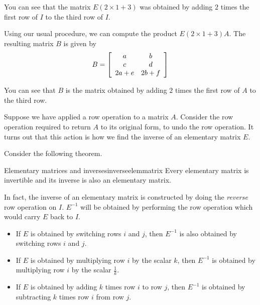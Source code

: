 \begin{solution}
You can see that the matrix $E\left( 2 \times 1+3\right)$ was obtained by adding $2$ times the first row
of $I$ to the third row of $I$. 

Using our usual procedure, we can compute the product $E\left( 2 \times 1+3\right)A$. The resulting 
matrix $B$ is given by 
\begin{equation*}
B = \left[
\begin{array}{cc}
a & b \\
c & d \\
2a+e & 2b+f
\end{array}
\right]
\end{equation*}

You can see that $B$ is the matrix obtained by adding $2$ times the first row of $A$ to the third row. 
\end{solution}

Suppose we have applied a row operation to a matrix $A$. Consider the row operation required to return $A$ to its original form, to undo
the row operation. It turns out that this action is how we find the inverse of an elementary matrix $E$. 

Consider the following theorem.

\begin{theorem}{Elementary matrices and inverses}{inverseelemmatrix}
Every elementary matrix is invertible and its inverse is also an elementary matrix.
\end{theorem}

In fact, the inverse of an elementary matrix is constructed by doing the {\em reverse \em}row operation on $I$. $E^{-1}$ will
be obtained by performing the row operation which would carry $E$ back to $I$. 

\begin{itemize}
\item If $E$ is obtained by switching rows $i$ and $j$, then $E^{-1}$ is also obtained by switching rows $i$ and $j$. 

\item If $E$ is obtained by multiplying row $i$ by the scalar $k$, then $E^{-1}$ is obtained by multiplying row $i$ by
the scalar $\frac{1}{k}$. 

\item If $E$ is obtained by adding $k$ times row $i$ to row $j$, then $E^{-1}$ is obtained by 
subtracting $k$ times row $i$ from row $j$.
\end{itemize} 

